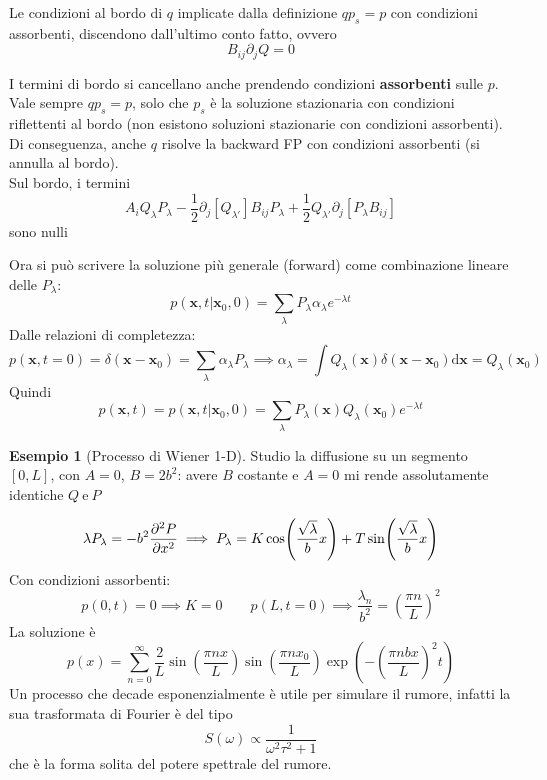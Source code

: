 \documentclass[a4paper,12pt]{article}
\theoremstyle{plain}
\renewcommand{\vec}[1]{{\boldsymbol{#1}}}
\theoremstyle{definition}
\newtheorem{exmp}{Esempio}[section]
\newcommand{\f}[2]{\frac{#1}{#2}}
\renewcommand{\d}{\text{d}}
\newcommand{\econg}{~\text{e}~}
\newcommand{\pos}{\vec{x}}
\theoremstyle{remark}
\begin{document}
\begin{obs}
	Le condizioni al bordo di $q$  implicate dalla definizione $q p_s=p$ con condizioni assorbenti, discendono dall'ultimo conto fatto, ovvero 
	\[B_{ij}\partial_j Q=0\]\label{oss}
\end{obs}
\begin{obs}
I termini di bordo
si cancellano anche prendendo condizioni \textbf{assorbenti}  sulle $p$. Vale sempre $q p_s=p$, solo che $p_s$ è la soluzione stazionaria con condizioni riflettenti al bordo (non esistono soluzioni stazionarie con condizioni assorbenti). Di conseguenza, anche $q$ risolve la backward FP con condizioni assorbenti (si annulla al bordo).
\\ Sul bordo, i termini 
\[A_i Q_\lambda P_\lambda-\f{1}{2}\partial_j [Q_{\lambda'}]B_{ij} P_\lambda+ \f{1}{2}Q_{\lambda'}\partial_j [P_\lambda B_{ij}]\]
sono nulli 
\end{obs}
Ora si può scrivere la soluzione più generale (forward) come combinazione lineare delle $P_\lambda$:
\[p(\pos,t|\pos_0,0)=\sum_{\lambda}P_\lambda \alpha_\lambda e^{-\lambda t}		\]
Dalle relazioni di completezza:
\[p(\pos,t=0)=\delta(\pos-\pos_0)=\sum_\lambda \alpha_\lambda P_\lambda\implies\alpha_\lambda=\int Q_\lambda(\pos)	\delta(\pos-\pos_0)\d \pos=Q_\lambda(\pos_0)	\]
Quindi 
\[p(\pos,t)=p(\pos,t|\pos_0,0)=\sum_{\lambda}P_\lambda(\pos	) Q_\lambda(\pos_0) e^{-\lambda t}		\]

\begin{exmp}[Processo di Wiener 1-D]
Studio la diffusione su un segmento $[0,L]$, con $A=0$, $B=2b^2$:
avere $B$ costante e $A=0$ mi rende assolutamente identiche  $Q\econg P$


\[\lambda P_\lambda=- b^2\pdv[2]{P}{x}\implies P_\lambda= K\cos(\f{\sqrt{\lambda}}{b}x)+T \sin(\f{\sqrt{\lambda}}{b}x)\]
Con condizioni assorbenti:
 \[p(0,t)=0\implies K=0\quad\quad p(L,t=0)\implies \f{\lambda_n}{b^2}=\left(\f{\pi n}{L}\right)^2
\]
La soluzione è
\[p(x)=\sum_{n=0}^{\infty}\f{2}{L}	\sin(\f{\pi n x}{L})\sin(\f{\pi n x_0}{L})\exp(-\left(\f{\pi n bx}{ L}\right)^2t)	\]
Un processo che decade esponenzialmente è utile per simulare il rumore, infatti la sua trasformata di Fourier è del tipo
\[S(\omega)\propto\f{1}{\omega^2\tau^2+1}\]
che è la forma solita del potere spettrale del rumore.
\end{exmp}
\end{document}
